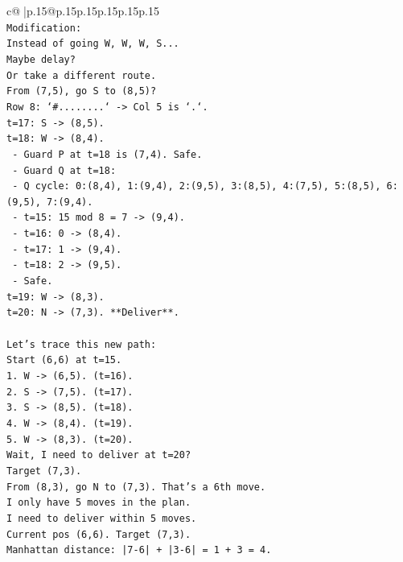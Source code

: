 \documentclass{article}
\begin{document}
{\begin{supertabular}{c@{$\;$}|p{.15\linewidth}@{}p{.15\linewidth}p{.15\linewidth}p{.15\linewidth}p{.15\linewidth}p{.15\linewidth}}
{{{\\ 
\texttt{Modification:} \\
\texttt{Instead of going W, W, W, S...} \\
\texttt{Maybe delay?} \\
\texttt{Or take a different route.} \\
\texttt{From (7,5), go S to (8,5)?} \\
\texttt{Row 8: `\#........` {-}> Col 5 is `.`.} \\
\texttt{t=17: S {-}> (8,5).} \\
\texttt{t=18: W {-}> (8,4).} \\
\texttt{  {-} Guard P at t=18 is (7,4). Safe.} \\
\texttt{  {-} Guard Q at t=18:} \\
\texttt{    {-} Q cycle: 0:(8,4), 1:(9,4), 2:(9,5), 3:(8,5), 4:(7,5), 5:(8,5), 6:(9,5), 7:(9,4).} \\
\texttt{    {-} t=15: 15 mod 8 = 7 {-}> (9,4).} \\
\texttt{    {-} t=16: 0 {-}> (8,4).} \\
\texttt{    {-} t=17: 1 {-}> (9,4).} \\
\texttt{    {-} t=18: 2 {-}> (9,5).} \\
\texttt{    {-} Safe.} \\
\texttt{t=19: W {-}> (8,3).} \\
\texttt{t=20: N {-}> (7,3). **Deliver**.} \\
\\ 
\texttt{Let's trace this new path:} \\
\texttt{Start (6,6) at t=15.} \\
\texttt{1. W {-}> (6,5). (t=16).} \\
\texttt{2. S {-}> (7,5). (t=17).} \\
\texttt{3. S {-}> (8,5). (t=18).} \\
\texttt{4. W {-}> (8,4). (t=19).} \\
\texttt{5. W {-}> (8,3). (t=20).} \\
\texttt{Wait, I need to deliver at t=20?} \\
\texttt{Target (7,3).} \\
\texttt{From (8,3), go N to (7,3). That's a 6th move.} \\
\texttt{I only have 5 moves in the plan.} \\
\texttt{I need to deliver within 5 moves.} \\
\texttt{Current pos (6,6). Target (7,3).} \\
\texttt{Manhattan distance: |7{-}6| + |3{-}6| = 1 + 3 = 4.} \\
}}}
\end{supertabular}}
\end{document}
